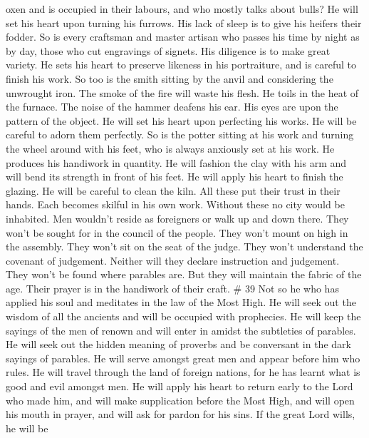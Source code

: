 oxen and is occupied in their labours, and who mostly talks about bulls?
 He will set his heart upon turning his furrows. His lack
of sleep is to give his heifers their fodder.  So is every
craftsman and master artisan who passes his time by night as by day,
those who cut engravings of signets. His diligence is to make great
variety. He sets his heart to preserve likeness in his portraiture, and
is careful to finish his work.  So too is the smith sitting
by the anvil and considering the unwrought iron. The smoke of the fire
will waste his flesh. He toils in the heat of the furnace. The noise of
the hammer deafens his ear. His eyes are upon the pattern of the object.
He will set his heart upon perfecting his works. He will be careful to
adorn them perfectly.  So is the potter sitting at his work
and turning the wheel around with his feet, who is always anxiously set
at his work. He produces his handiwork in quantity.  He
will fashion the clay with his arm and will bend its strength in front
of his feet. He will apply his heart to finish the glazing. He will be
careful to clean the kiln.  All these put their trust in
their hands. Each becomes skilful in his own work.  Without
these no city would be inhabited. Men wouldn't reside as foreigners or
walk up and down there.  They won't be sought for in the
council of the people. They won't mount on high in the assembly. They
won't sit on the seat of the judge. They won't understand the covenant
of judgement. Neither will they declare instruction and judgement. They
won't be found where parables are.  But they will maintain
the fabric of the age. Their prayer is in the handiwork of their craft.
\# 39  Not so he who has applied his soul and meditates in
the law of the Most High. He will seek out the wisdom of all the
ancients and will be occupied with prophecies.  He will keep
the sayings of the men of renown and will enter in amidst the subtleties
of parables.  He will seek out the hidden meaning of
proverbs and be conversant in the dark sayings of parables. 
He will serve amongst great men and appear before him who rules. He will
travel through the land of foreign nations, for he has learnt what is
good and evil amongst men.  He will apply his heart to
return early to the Lord who made him, and will make supplication before
the Most High, and will open his mouth in prayer, and will ask for
pardon for his sins.  If the great Lord wills, he will be

